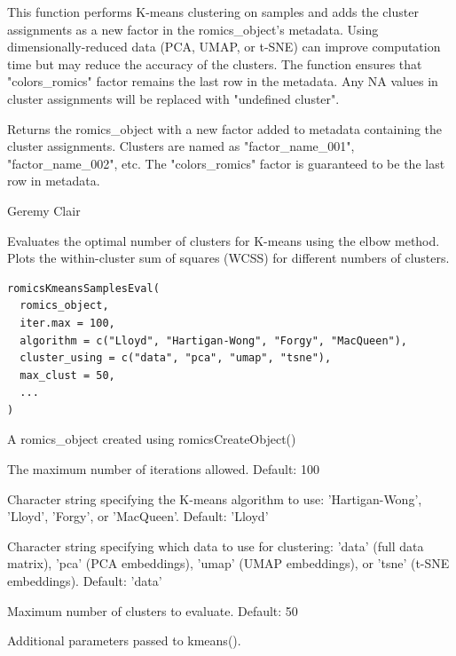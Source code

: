 \documentclass[a4paper]{book}
\begin{document}
%
\begin{Details}
This function performs K-means clustering on samples and adds the cluster assignments
as a new factor in the romics\_object's metadata. Using dimensionally-reduced data
(PCA, UMAP, or t-SNE) can improve computation time but may reduce the accuracy of the clusters.
The function ensures that "colors\_romics" factor remains the last row in the metadata.
Any NA values in cluster assignments will be replaced with "undefined cluster".
\end{Details}
%
\begin{Value}
Returns the romics\_object with a new factor added to metadata containing the cluster assignments.
Clusters are named as "factor\_name\_001", "factor\_name\_002", etc.
The "colors\_romics" factor is guaranteed to be the last row in metadata.
\end{Value}
%
\begin{Author}
Geremy Clair
\end{Author}
%
\begin{Description}
Evaluates the optimal number of clusters for K-means using the elbow method.
Plots the within-cluster sum of squares (WCSS) for different numbers of clusters.
\end{Description}
%
\begin{Usage}
\begin{verbatim}
romicsKmeansSamplesEval(
  romics_object,
  iter.max = 100,
  algorithm = c("Lloyd", "Hartigan-Wong", "Forgy", "MacQueen"),
  cluster_using = c("data", "pca", "umap", "tsne"),
  max_clust = 50,
  ...
)
\end{verbatim}
\end{Usage}
%
\begin{Arguments}
\begin{ldescription}
\item[\code{romics\_object}] A romics\_object created using romicsCreateObject()

\item[\code{iter.max}] The maximum number of iterations allowed. Default: 100

\item[\code{algorithm}] Character string specifying the K-means algorithm to use:
'Hartigan-Wong', 'Lloyd', 'Forgy', or 'MacQueen'. Default: 'Lloyd'

\item[\code{cluster\_using}] Character string specifying which data to use for clustering:
'data' (full data matrix), 'pca' (PCA embeddings), 'umap' (UMAP embeddings), or 'tsne' (t-SNE embeddings). Default: 'data'

\item[\code{max\_clust}] Maximum number of clusters to evaluate. Default: 50

\item[\code{...}] Additional parameters passed to kmeans().
\end{ldescription}
\end{Arguments}
\end{document}
